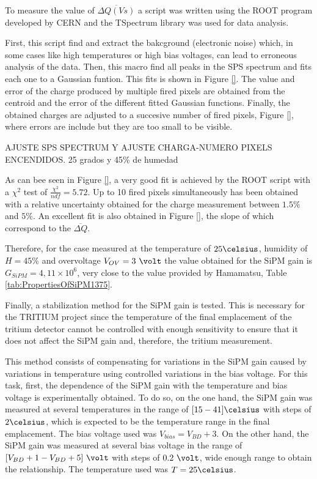 To measure the value of $\overline{\Delta Q (Vs)}$ a script was written using the ROOT program \cite{ROOTWebPage} developed by CERN and the TSpectrum library was used for data analysis. 

First, this script find and extract the bakcground (electronic noise) which, in some cases like high temperatures or high bias voltages, can lead to erroneous analysis of the data. Then, this macro find all peaks in the SPS spectrum and fits each one to a Gaussian funtion. This fits is shown in Figure \ref{}. The value and error of the charge produced by multiple fired pixels are obtained from the centroid and the error of the different fitted Gaussian functions. Finally, the obtained charges are adjusted to a succesive number of fired pixels, Figure \ref{}, where errors are include but they are too small to be visible.

AJUSTE SPS SPECTRUM Y AJUSTE CHARGA-NUMERO PIXELS ENCENDIDOS. 25 grados y 45\% de humedad

As can bee seen in Figure \ref{}, a very good fit is achieved by the ROOT script with a $\chi^2$ test of $\frac{\chi^2}{ndf}=5.72$. Up to 10 fired pixels simultaneously has been obtained with a relative uncertainty obtained for the charge measurement between $1.5\%$ and $5\%$. An excellent fit is also obtained in Figure \ref{}, the slope of which correspond to the $\overline{\Delta Q}$.

Therefore, for the case measured at the temperature of $25\celsius$, humidity of $H=45\%$ and overvoltage $V_{OV}=3~\volt$ the value obtained for the SiPM gain is $G_{SiPM}=4,11\times 10^{6}$, very close to the value provided by Hamamatsu, Table \ref{tab:PropertiesOfSiPM1375}.

Finally, a stabilization method for the SiPM gain is tested. This is necessary for the TRITIUM project since the temperature of the final emplacement of the tritium detector cannot be controlled with enough sensitivity to ensure that it does not affect the SiPM gain and, therefore, the tritium measurement. 

This method consists of compensating for variations in the SiPM gain caused by variations in temperature using controlled variations in the bias voltage. For this task, first, the dependence of the SiPM gain with the temperature and bias voltage is experimentally obtained. To do so, on the one hand, the SiPM gain was measured at several temperatures in the range of $[15-41]\celsius$ with steps of $2\celsius$, which is expected to be the temperature range in the final emplacement. The bias voltage used was $V_{bias} = V_{BD}+3$. On the other hand, the SiPM gain was measured at several bias voltage in the range of $[V_{BD}+1-V_{BD}+5]~\volt$ with steps of $0.2~\volt$, wide enough range to obtain the relationship. The temperature used was $T=25\celsius$.

